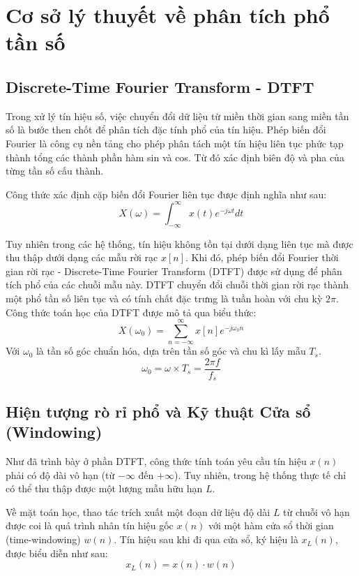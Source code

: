 \section{Cơ sở lý thuyết về phân tích phổ tần số}
\subsection{Discrete-Time Fourier Transform - DTFT}
Trong xử lý tín hiệu số, việc chuyển đổi dữ liệu từ miền thời gian sang miền tần số là bước then chốt để phân tích đặc tính phổ của tín hiệu.
Phép biến đổi Fourier là công cụ nền tảng cho phép phân tách một tín hiệu liên tục phức tạp thành tổng các thành phần hàm sin và cos.
Từ đó xác định biên độ và pha của từng tần số cấu thành.

Công thức xác định cặp biến đổi Fourier liên tục được định nghĩa như sau:
\begin{equation}
X(\omega) = \int_{-\infty}^{\infty} x(t) e^{-j \omega t} dt
\end{equation}

Tuy nhiên trong các hệ thống, tín hiệu không tồn tại dưới dạng liên tục mà được thu thập dưới dạng các mẫu rời rạc $x[n]$. Khi đó, phép biến đổi Fourier thời gian rời rạc - Discrete-Time Fourier Transform (DTFT) được sử dụng để phân tích phổ của các chuỗi mẫu này.
DTFT chuyển đổi chuỗi thời gian rời rạc thành một phổ tần số liên tục và có tính chất đặc trưng là tuần hoàn với chu kỳ $2\pi$. Công thức toán học của DTFT được mô tả qua biểu thức:
\begin{equation}
X(\omega_0) = \sum_{n=-\infty}^{\infty} x[n] e^{-j\omega_0 n}
\end{equation}
Với $\omega_0$ là tần số góc chuẩn hóa, dựa trên tần số góc và chu kì lấy mẫu $T_s$.
$$\omega_0 = \omega \times T_s = \dfrac{2\pi f}{f_s}$$

\subsection{Hiện tượng rò rỉ phổ và Kỹ thuật Cửa sổ (Windowing)}

Như đã trình bày ở phần DTFT, công thức tính toán yêu cầu tín hiệu $x(n)$ phải có độ dài vô hạn (từ $-\infty$ đến $+\infty$). Tuy nhiên, trong hệ thống thực tế chỉ có thể thu thập được một lượng mẫu hữu hạn $L$. 

Về mặt toán học, thao tác trích xuất một đoạn dữ liệu độ dài $L$ từ chuỗi vô hạn được coi là quá trình nhân tín hiệu gốc $x(n)$ với một hàm cửa sổ thời gian (time-windowing) $w(n)$. Tín hiệu sau khi đi qua cửa sổ, ký hiệu là $x_L(n)$, được biểu diễn như sau:
\begin{equation}
x_L(n) = x(n) \cdot w(n)
\end{equation}


